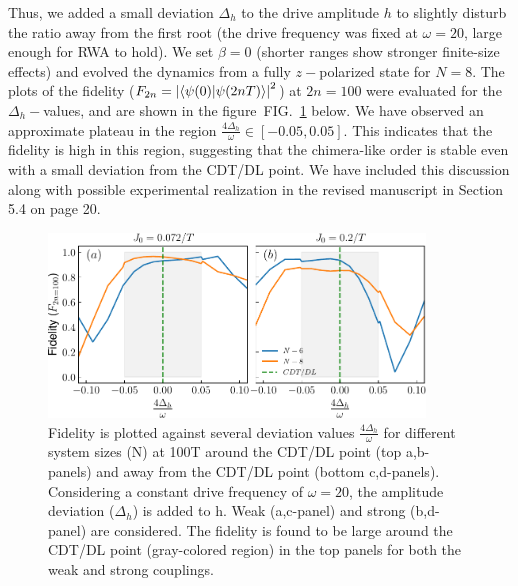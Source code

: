 \documentclass[aps,prb,reprint,showpacs,floatfix,superscriptaddress, onecolumn, nofootinbib, 10pt]{revtex4-2}
\newcommand{\figref}[1]{FIG.~\ref{#1}}
\begin{document}
\begin{enumerate}
\begin{enumerate}
\begin{enumerate}
{			Thus, we added a small deviation $\Delta_h$  to the drive amplitude $h$ to slightly disturb the ratio away from the first root (the  drive frequency was fixed at $\omega = 20$, large enough for RWA to hold). We set $\beta=0$ (shorter ranges show stronger finite-size effects) and evolved the dynamics from a fully $z-$polarized state for $N = 8$.
			The plots of the fidelity ($F_{2n} = \abs{\braket{\psi(0)}{\psi (2nT)}}^2$) at $2n=100$ were evaluated for the $\Delta_h-$values, and are shown in the figure~\figref{Fig:aroundCDT} below. 
			We have observed an approximate plateau in the region $\displaystyle\frac{4\Delta_h}{\omega} \in[-0.05, 0.05]$. This indicates that the fidelity is high in this region, suggesting that the chimera-like order is stable even with a small deviation from the CDT/DL point. We have included this discussion along with possible  experimental realization in the revised manuscript in Section 5.4 on page 20.	
			\begin{figure}[h!]
				\begin{center}
					\includegraphics[width=10cm]{./figs/figure14.pdf}
				\end{center}
				\caption{Fidelity is plotted against several deviation values $\frac{4\Delta_h}{\omega}$ for different system sizes (N) at 100T around the CDT/DL point (top a,b-panels) and away from the CDT/DL point (bottom c,d-panels). Considering a constant drive frequency of $\omega= 20$, the amplitude deviation ($\Delta_h$) is added to h. Weak (a,c-panel) and strong (b,d-panel) are considered. The fidelity is found to be large around the CDT/DL point (gray-colored region) in the top panels for both the weak and strong couplings.}
				\label{Fig:aroundCDT}
			\end{figure}
		
			}
		\end{enumerate}
		

\end{enumerate}
\end{enumerate}
\end{document}
